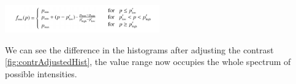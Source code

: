\documentclass[journal,transmag]{IEEEtran}
\begin{document}
\begin{center}
	\includegraphics[width=0.5\textwidth]{figures/contrAdjFormula.png}
	\label{fig:contrAdjFormula}
\end{center}

\noindent We can see the difference in the histograms after adjusting the contrast \ref{fig:contrAdjustedHist}, the value range now occupies the whole spectrum of possible intensities.
	

\end{document}
